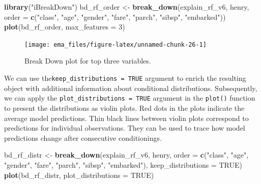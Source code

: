 \documentclass[12pt,]{krantz}
\newenvironment{Shaded}{\begin{snugshade}}{\end{snugshade}}
\newcommand{\DataTypeTok}[1]{\textcolor[rgb]{0.13,0.29,0.53}{#1}}
\newcommand{\DecValTok}[1]{\textcolor[rgb]{0.00,0.00,0.81}{#1}}
\newcommand{\KeywordTok}[1]{\textcolor[rgb]{0.13,0.29,0.53}{\textbf{#1}}}
\newcommand{\NormalTok}[1]{#1}
\newcommand{\OtherTok}[1]{\textcolor[rgb]{0.56,0.35,0.01}{#1}}
\newcommand{\StringTok}[1]{\textcolor[rgb]{0.31,0.60,0.02}{#1}}
\begin{document}
\begin{Shaded}
\begin{Highlighting}[]
\KeywordTok{library}\NormalTok{(}\StringTok{"iBreakDown"}\NormalTok{)}
\NormalTok{bd_rf_order <-}\StringTok{ }\KeywordTok{break_down}\NormalTok{(explain_rf_v6,}
\NormalTok{                 henry,}
                 \DataTypeTok{order =} \KeywordTok{c}\NormalTok{(}\StringTok{"class"}\NormalTok{, }\StringTok{"age"}\NormalTok{, }\StringTok{"gender"}\NormalTok{, }\StringTok{"fare"}\NormalTok{, }\StringTok{"parch"}\NormalTok{, }\StringTok{"sibsp"}\NormalTok{, }\StringTok{"embarked"}\NormalTok{))}
\KeywordTok{plot}\NormalTok{(bd_rf_order, }\DataTypeTok{max_features =} \DecValTok{3}\NormalTok{) }
\end{Highlighting}
\end{Shaded}

\begin{figure}

{\centering \texttt{[image: ema\_files/figure-latex/unnamed-chunk-26-1]} 

}

\caption{Break Down plot for top three variables.}\label{fig:unnamed-chunk-26}
\end{figure}

We can use the\texttt{keep\_distributions\ =\ TRUE} argument to enrich the resulting object with additional information about conditional distributions. Subsequently, we can apply the \texttt{plot\_distributions\ =\ TRUE} argument in the \texttt{plot()} function to present the distributions as violin plots. Red dots in the plots indicate the average model predictions. Thin black lines between violin plots correspond to predictions for individual observations. They can be used to trace how model predictions change after consecutive conditionings.

\begin{Shaded}
\begin{Highlighting}[]
\NormalTok{bd_rf_distr <-}\StringTok{ }\KeywordTok{break_down}\NormalTok{(explain_rf_v6,}
\NormalTok{                 henry,}
                 \DataTypeTok{order =} \KeywordTok{c}\NormalTok{(}\StringTok{"class"}\NormalTok{, }\StringTok{"age"}\NormalTok{, }\StringTok{"gender"}\NormalTok{, }\StringTok{"fare"}\NormalTok{, }\StringTok{"parch"}\NormalTok{, }\StringTok{"sibsp"}\NormalTok{, }\StringTok{"embarked"}\NormalTok{),}
                 \DataTypeTok{keep_distributions =} \OtherTok{TRUE}\NormalTok{)}
\KeywordTok{plot}\NormalTok{(bd_rf_distr, }\DataTypeTok{plot_distributions =} \OtherTok{TRUE}\NormalTok{) }
\end{Highlighting}
\end{Shaded}
\end{document}
